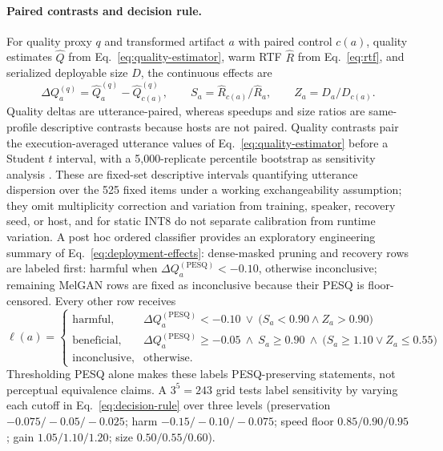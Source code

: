 \paragraph{Paired contrasts and decision rule.}
For quality proxy $q$ and transformed artifact $a$ with paired control
$c(a)$, quality estimates $\widehat Q$ from
Eq.~\eqref{eq:quality-estimator}, warm RTF $\widehat R$ from
Eq.~\eqref{eq:rtf}, and serialized deployable size $D$, the continuous
effects are
\begin{equation}
  \Delta Q_a^{(q)}=\widehat Q_a^{(q)}-\widehat Q_{c(a)}^{(q)},\qquad
  S_a=\widehat R_{c(a)}/\widehat R_a,\qquad
  Z_a=D_a/D_{c(a)}.
  \label{eq:deployment-effects}
\end{equation}
Quality deltas are utterance-paired, whereas speedups and size ratios are
same-profile descriptive contrasts because hosts are not paired.  Quality
contrasts pair the execution-averaged utterance values of
Eq.~\eqref{eq:quality-estimator} before a Student $t$ interval, with a
5,000-replicate percentile bootstrap as sensitivity analysis
\citep{student1908probableerror,efron1979bootstrap}.  These are fixed-set
descriptive intervals quantifying utterance dispersion over the 525 fixed
items under a working exchangeability assumption; they omit multiplicity
correction and variation from training, speaker, recovery seed, or host,
and for static INT8 do not separate calibration from runtime variation.
A post hoc ordered classifier provides an exploratory engineering summary
of Eq.~\eqref{eq:deployment-effects}: dense-masked pruning and recovery rows
are labeled first: harmful when $\Delta Q_a^{(\mathrm{PESQ})}<-0.10$,
otherwise inconclusive; remaining MelGAN rows are fixed as inconclusive
because their PESQ is floor-censored.  Every other row receives
\begin{equation}
  \ell(a)=
  \begin{cases}
    \text{harmful}, &
      \Delta Q_a^{(\mathrm{PESQ})}<-0.10
      \ \lor\ \bigl(S_a<0.90\wedge Z_a>0.90\bigr)\\[1pt]
    \text{beneficial}, &
      \Delta Q_a^{(\mathrm{PESQ})}\ge-0.05
      \ \wedge\ S_a\ge0.90
      \ \wedge\ \bigl(S_a\ge1.10\lor Z_a\le0.55\bigr)\\[1pt]
    \text{inconclusive}, & \text{otherwise.}
  \end{cases}
  \label{eq:decision-rule}
\end{equation}
Thresholding PESQ alone makes these labels PESQ-preserving statements, not
perceptual equivalence claims.  A $3^5=243$ grid tests label sensitivity by
varying each cutoff in Eq.~\eqref{eq:decision-rule} over three levels
(preservation $-0.075/-0.05/-0.025$; harm $-0.15/-0.10/-0.075$; speed floor
$0.85/0.90/0.95$; gain $1.05/1.10/1.20$; size $0.50/0.55/0.60$).

